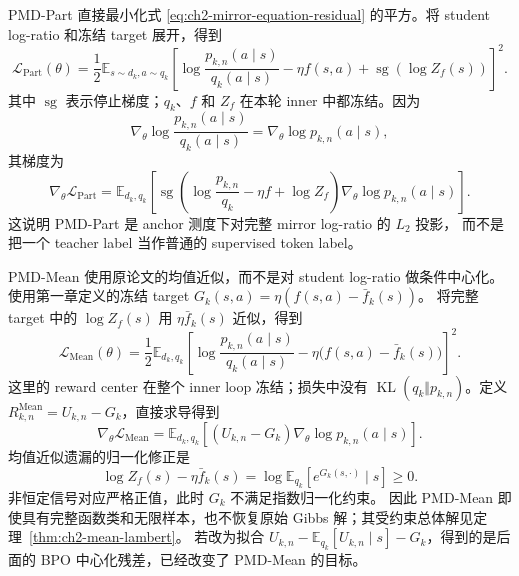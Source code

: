 PMD-Part 直接最小化式 \eqref{eq:ch2-mirror-equation-residual} 的平方。将
student log-ratio 和冻结 target 展开，得到
\begin{equation}
\label{eq:ch2-regression-from-mirror}
\mathcal L_{\mathrm{Part}}(\theta)
=\frac12\mathbb E_{s\sim d_k,a\sim q_k}
\left[
\log\frac{ p_{k,n}(a\mid s)}{ q_k(a\mid s)}
-\eta f(s,a)+\operatorname{sg}\!\left(\log Z_f(s)\right)
\right]^2.
\end{equation}
其中 $\operatorname{sg}$ 表示停止梯度；$ q_k$、$f$ 和 $Z_f$ 在本轮
inner 中都冻结。因为
\begin{equation*}
\nabla_\theta\log\frac{ p_{k,n}(a\mid s)}{ q_k(a\mid s)}
=\nabla_\theta\log p_{k,n}(a\mid s),
\end{equation*}
其梯度为
\begin{equation}
\nabla_\theta\mathcal L_{\mathrm{Part}}
=\mathbb E_{d_k, q_k}
\left[\operatorname{sg}\!\left(
\log\frac{ p_{k,n}}{ q_k}-\eta f+\log Z_f
\right)\nabla_\theta\log p_{k,n}(a\mid s)\right].
\label{eq:ch2-part-gradient-bridge}
\end{equation}
这说明 PMD-Part 是 anchor 测度下对完整 mirror log-ratio 的 $L_2$ 投影，
而不是把一个 teacher label 当作普通的 supervised token label。

PMD-Mean 使用原论文的均值近似，而不是对 student log-ratio 做条件中心化。使用第一章定义的冻结 target $G_k(s,a)=\eta(f(s,a)-\bar f_k(s))$。
将完整 target 中的 $\log Z_f(s)$ 用 $\eta\bar f_k(s)$ 近似，得到
\begin{equation}
\mathcal L_{\mathrm{Mean}}(\theta)
=\frac12\mathbb E_{d_k, q_k}
\left[\log\frac{ p_{k,n}(a\mid s)}{ q_k(a\mid s)}
-\eta\bigl(f(s,a)-\bar f_k(s)\bigr)\right]^2.
\label{eq:ch2-mean-loss-bridge}
\end{equation}
这里的 reward center 在整个 inner loop 冻结；损失中没有
$\operatorname{KL}( q_k\Vert p_{k,n})$。定义 $R_{k,n}^{\mathrm{Mean}}=U_{k,n}-G_k$，直接求导得到
\begin{equation}
\nabla_\theta\mathcal L_{\mathrm{Mean}}
=\mathbb E_{d_k, q_k}
\left[(U_{k,n}-G_k)\nabla_\theta\log p_{k,n}(a\mid s)\right].
\label{eq:ch2-mean-gradient-bridge}
\end{equation}
均值近似遗漏的归一化修正是
\begin{equation*}
\log Z_f(s)-\eta\bar f_k(s)
=\log\mathbb E_{ q_k}[e^{G_k(s,\cdot)}\mid s]\ge0.
\end{equation*}
非恒定信号对应严格正值，此时 $G_k$ 不满足指数归一化约束。
因此 PMD-Mean 即使具有完整函数类和无限样本，也不恢复原始 Gibbs 解；其受约束总体解见定理~\ref{thm:ch2-mean-lambert}。
若改为拟合 $U_{k,n}-\mathbb E_{ q_k}[U_{k,n}\mid s]-G_k$，得到的是后面的 BPO 中心化残差，已经改变了 PMD-Mean 的目标。

